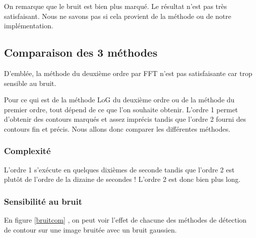 \documentclass[paper=a4, fontsize=11pt]{scrartcl} %
\begin{document}
\begin{figure}[h!]
\end{figure}
On remarque que le bruit est bien plus marqué. Le résultat n'est pas très satisfaisant. Nous ne savons pas si cela provient de la méthode ou de notre implémentation. 

\subsection{Comparaison des 3 méthodes}
D'emblée, la méthode du deuxième ordre par FFT n'est pas satisfaisante car trop sensible au bruit.

Pour ce qui est de la méthode LoG du deuxième ordre ou de la méthode du premier ordre, tout dépend de ce que l'on souhaite obtenir. L'ordre 1 permet d'obtenir des contours marqués et assez imprécis tandis que l'ordre 2 fourni des contours fin et précis. Nous allons donc comparer les différentes méthodes.
\subsubsection{Complexité}
L'ordre 1 s'exécute en quelques dixièmes de seconde tandis que l'ordre 2 est plutôt de l'ordre de la dizaine de secondes ! L'ordre 2 est donc bien plus long.

\subsubsection{Sensibilité au bruit}
En figure \ref{bruitcom} , on peut voir l'effet de chacune des méthodes de détection de contour sur une image bruitée avec un bruit gaussien.
\end{document}

